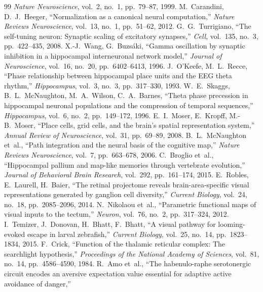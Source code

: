 \documentclass[11pt,a4paper]{article}
\begin{document}
\begin{thebibliography}{99}
  \textit{Nature Neuroscience}, vol.~2, no.~1, pp.~79--87, 1999.
  M.~Carandini, D.~J.~Heeger,
  ``Normalization as a canonical neural computation,''
  \textit{Nature Reviews Neuroscience}, vol.~13, no.~1, pp.~51--62, 2012.
  G.~G.~Turrigiano,
  ``The self-tuning neuron: Synaptic scaling of excitatory synapses,''
  \textit{Cell}, vol.~135, no.~3, pp.~422--435, 2008.
  X.-J.~Wang, G.~Buzsáki,
  ``Gamma oscillation by synaptic inhibition in a hippocampal interneuronal network model,''
  \textit{Journal of Neuroscience}, vol.~16, no.~20, pp.~6402--6413, 1996.
  J.~O'Keefe, M.~L.~Recce,
  ``Phase relationship between hippocampal place units and the EEG theta rhythm,''
  \textit{Hippocampus}, vol.~3, no.~3, pp.~317--330, 1993.
  W.~E.~Skaggs, B.~L.~McNaughton, M.~A.~Wilson, C.~A.~Barnes,
  ``Theta phase precession in hippocampal neuronal populations and the compression of temporal sequences,''
  \textit{Hippocampus}, vol.~6, no.~2, pp.~149--172, 1996.
  E.~I.~Moser, E.~Kropff, M.-B.~Moser,
  ``Place cells, grid cells, and the brain's spatial representation system,''
  \textit{Annual Review of Neuroscience}, vol.~31, pp.~69--89, 2008.
  B.~L.~McNaughton et~al.,
  ``Path integration and the neural basis of the cognitive map,''
  \textit{Nature Reviews Neuroscience}, vol.~7, pp.~663--678, 2006.
  C.~Broglio et~al.,
  ``Hippocampal pallium and map-like memories through vertebrate evolution,''
  \textit{Journal of Behavioral Brain Research}, vol.~292, pp.~161--174, 2015.
  E.~Robles, E.~Laurell, H.~Baier,
  ``The retinal projectome reveals brain-area-specific visual representations generated by ganglion cell diversity,''
  \textit{Current Biology}, vol.~24, no.~18, pp.~2085--2096, 2014.
  N.~Nikolaou et~al.,
  ``Parametric functional maps of visual inputs to the tectum,''
  \textit{Neuron}, vol.~76, no.~2, pp.~317--324, 2012.
  I.~Temizer, J.~Donovan, H.~Bhatt, F.~Bhatt,
  ``A visual pathway for looming-evoked escape in larval zebrafish,''
  \textit{Current Biology}, vol.~25, no.~14, pp.~1823--1834, 2015.
  F.~Crick,
  ``Function of the thalamic reticular complex: The searchlight hypothesis,''
  \textit{Proceedings of the National Academy of Sciences}, vol.~81, no.~14, pp.~4586--4590, 1984.
  R.~Amo et~al.,
  ``The habenulo-raphe serotonergic circuit encodes an aversive expectation value essential for adaptive active avoidance of danger,''

\end{thebibliography}
\end{document}
